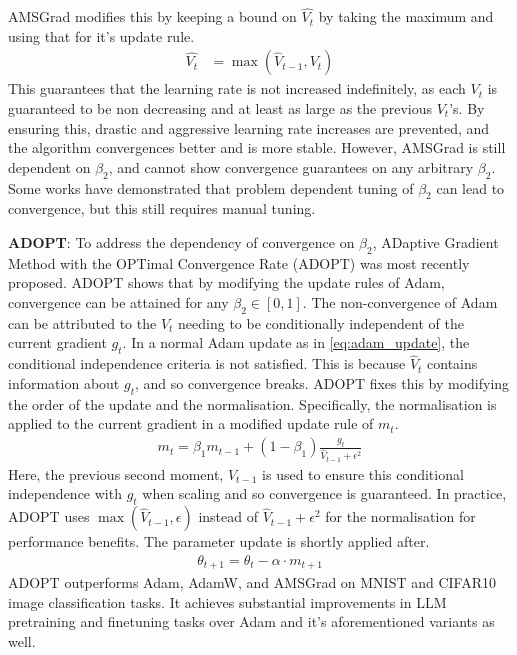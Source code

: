 AMSGrad modifies this by keeping a bound on $\hat{V_t}$ by taking the maximum and using that for it's update rule.
\begin{align}
    \hat{V_{t}} &= \max(\hat{V}_{t-1}, V_t)
\end{align}
This guarantees that the learning rate is not increased indefinitely, as each $V_t$ is guaranteed to be non decreasing and at least as large as the previous $V_t$'s. By ensuring this, drastic and aggressive learning rate increases are prevented, and the algorithm convergences better and is more stable. However, AMSGrad is still dependent on $\beta_2$, and cannot show convergence guarantees on any arbitrary $\beta_2$. Some works have demonstrated that problem dependent tuning of $\beta_2$ can lead to convergence, but this still requires manual tuning.

\textbf{ADOPT}: To address the dependency of convergence on $\beta_2$,  ADaptive Gradient Method with the OPTimal Convergence Rate (ADOPT) was most recently proposed. ADOPT shows that by modifying the update rules of Adam, convergence can be attained for any $\beta_2 \in [0, 1]$. The non-convergence of Adam can be attributed to the $V_t$ needing to be conditionally independent of the current gradient $g_t$. In a normal Adam update as in \cref{eq:adam_update}, the conditional independence criteria is not satisfied. This is because $\hat{V}_t$ contains information about $g_t$, and so convergence breaks. ADOPT fixes this by modifying the order of the update and the normalisation. Specifically, the normalisation is applied to the current gradient in a modified update rule of $m_t$.
\begin{align}
    m_t = \beta_1 m_{t-1} + (1 - \beta_1) \frac{g_t}{\hat{V}_{t-1} + \epsilon^2}
\end{align}
Here, the previous second moment, $V_{t-1}$ is used to ensure this conditional independence with $g_t$ when scaling and so convergence is guaranteed. In practice, ADOPT uses $\max(\hat{V}_{t-1}, \epsilon)$ instead of $\hat{V}_{t-1} + \epsilon^2$ for the normalisation for performance benefits. The parameter update is shortly applied after.
\begin{align}
    \theta_{t+1} = \theta_{t} - \alpha \cdot m_{t+1}
\end{align}
ADOPT outperforms Adam, AdamW, and AMSGrad on MNIST and CIFAR10 image classification tasks.
It achieves substantial improvements in LLM pretraining and finetuning tasks over Adam and it's aforementioned variants as well. 

